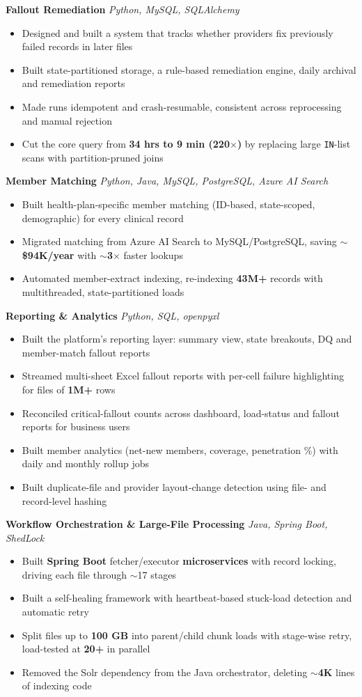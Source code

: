 \documentclass[a4paper,10pt]{article}
\newcommand{\resumeProjectHeading}[2]{\item \textbf{#1} \textbar{} \textit{#2}}
\newcommand{\resumeItem}[1]{\item #1}
\newcommand{\resumeSubPointListStart}{\begin{itemize}[leftmargin=14pt, label=--, topsep=0.5pt, itemsep=0.5pt, parsep=0pt, partopsep=0pt]}
\newcommand{\resumeSubPointListEnd}{\end{itemize}}
\begin{document}
    \resumeProjectHeading{Fallout Remediation}{Python, MySQL, SQLAlchemy}
    \resumeSubPointListStart
      \resumeItem{Designed and built a system that tracks whether providers fix previously failed records in later files}
      \resumeItem{Built state-partitioned storage, a rule-based remediation engine, daily archival and remediation reports}
      \resumeItem{Made runs idempotent and crash-resumable, consistent across reprocessing and manual rejection}
      \resumeItem{Cut the core query from \textbf{34 hrs to 9 min (220$\times$)} by replacing large \texttt{IN}-list scans with partition-pruned joins}
    \resumeSubPointListEnd

    \resumeProjectHeading{Member Matching}{Python, Java, MySQL, PostgreSQL, Azure AI Search}
    \resumeSubPointListStart
      \resumeItem{Built health-plan-specific member matching (ID-based, state-scoped, demographic) for every clinical record}
      \resumeItem{Migrated matching from Azure AI Search to MySQL/PostgreSQL, saving \textbf{$\sim$\$94K/year} with \textbf{$\sim$3$\times$} faster lookups}
      \resumeItem{Automated member-extract indexing, re-indexing \textbf{43M+} records with multithreaded, state-partitioned loads}
    \resumeSubPointListEnd

    \resumeProjectHeading{Reporting \& Analytics}{Python, SQL, openpyxl}
    \resumeSubPointListStart
      \resumeItem{Built the platform's reporting layer: summary view, state breakouts, DQ and member-match fallout reports}
      \resumeItem{Streamed multi-sheet Excel fallout reports with per-cell failure highlighting for files of \textbf{1M+} rows}
      \resumeItem{Reconciled critical-fallout counts across dashboard, load-status and fallout reports for business users}
      \resumeItem{Built member analytics (net-new members, coverage, penetration \%) with daily and monthly rollup jobs}
      \resumeItem{Built duplicate-file and provider layout-change detection using file- and record-level hashing}
    \resumeSubPointListEnd

    \resumeProjectHeading{Workflow Orchestration \& Large-File Processing}{Java, Spring Boot, ShedLock}
    \resumeSubPointListStart
      \resumeItem{Built \textbf{Spring Boot} fetcher/executor \textbf{microservices} with record locking, driving each file through $\sim$17 stages}
      \resumeItem{Built a self-healing framework with heartbeat-based stuck-load detection and automatic retry}
      \resumeItem{Split files up to \textbf{100 GB} into parent/child chunk loads with stage-wise retry, load-tested at \textbf{20+} in parallel}
      \resumeItem{Removed the Solr dependency from the Java orchestrator, deleting $\sim$\textbf{4K} lines of indexing code}
    \resumeSubPointListEnd
\end{document}
